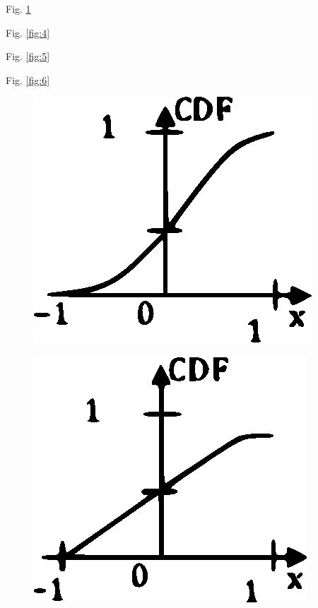 \documentclass[journal,12pt,twocolumn]{IEEEtran}
\begin{document}
\begin{enumerate}
\begin{enumerate}
\begin{multicols}{2}
\item Fig. \ref{fig:3}

\item Fig. \ref{fig:4}

\item Fig. \ref{fig:5}

\item Fig. \ref{fig:6}



\end{multicols}
\end{enumerate}
\begin{figure}[!h]
\includegraphics[width=\columnwidth]{./figs/figure3.eps}
\caption{}
\label{fig:3}
\end{figure}
\begin{figure}[!h]
\includegraphics[width=\columnwidth]{./figs/figure4.eps}

\end{figure}
\end{enumerate}
\end{document}
